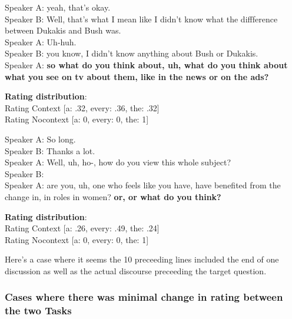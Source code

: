 \documentclass[12pt,letterpaper,table,svgnames,dvipsnames]{article}
\begin{document}
\begin{exe}
\ex {}
    \begin{xlist}
    \ex {}
    Speaker A: yeah, that's okay.\\
    Speaker B: Well, that's what I mean like I didn't know what the diffference between Dukakis and Bush was.\\
    Speaker A: Uh-huh.\\
    Speaker B: you know, I didn't know anything about Bush or Dukakis.\\
    Speaker A: \textbf{so what do you think about, uh, what do you think about what you see on tv about them, like in the news or on the ads?}
    
    \ex \textbf{Rating distribution}:\\
    Rating Context [a: .32, every: .36, the: .32]\\
    Rating Nocontext [a: 0, every: 0, the: 1]
    \end{xlist}
\end{exe}


\begin{exe}
\ex {}
    \begin{xlist}
    \ex {}
    Speaker A: So long.\\
    Speaker B: Thanks a lot. \\
    Speaker A: Well, uh, ho-, how do you view this whole subject?\\
    Speaker B: \\
    Speaker A: are you, uh, one who feels like you have, have benefited from the change in, in roles in women? \textbf{or, or what do you think?}
    
    \ex \textbf{Rating distribution}:\\
    Rating Context [a: .26, every: .49, the: .24]\\
    Rating Nocontext [a: 0, every: 0, the: 1]
    \end{xlist}
\end{exe}

Here's a case where it seems the 10 preceeding lines included the end of one discussion as well as the actual discourse preceeding the target question.



\subsubsection{Cases where there was minimal change in rating between the two Tasks}

\end{document}
